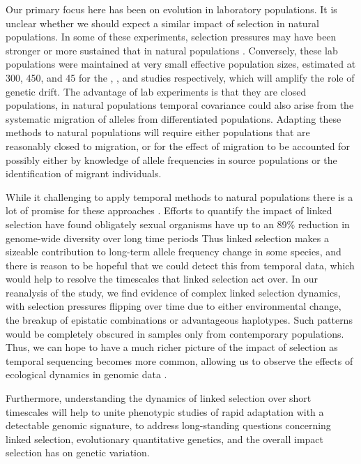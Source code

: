 \documentclass[11pt]{article}
\begin{document}
Our primary focus here has been on evolution in laboratory populations. It is
unclear whether we should expect a similar impact of selection in natural
populations. In some of these experiments, selection pressures may have been
stronger or more sustained that in natural populations
\parencite{Hendry1999-zu,Hairston2005-ga}. Conversely, these lab
populations were maintained at very small effective population sizes, estimated
at 300, 450, and 45 for the \textcite{Barghi2019-qy}, \textcite{Kelly2019-dc},
and \textcite{Castro2019-uk} studies respectively, which will amplify the role
of genetic drift. The advantage of lab experiments is that they are closed
populations, in natural populations temporal covariance could also arise from
the systematic migration of alleles from differentiated populations.
Adapting these methods to natural populations will require either
populations that are reasonably closed to migration, or for the effect of
migration to be accounted for possibly either by knowledge of allele
frequencies in source populations or the identification of migrant individuals. 

While it challenging to apply temporal methods to natural populations there is
a lot of promise for these approaches
\parencite{Bergland2014-ij,Machado2018-cs}. Efforts to quantify the impact of
linked selection have found obligately sexual organisms have up to an 89\%
reduction in genome-wide diversity over long time periods
\parencite{McVicker2009-ax,Elyashiv2016-vt,Corbett-Detig2015-gt,Coop2016-gx,Comeron2014-nh}
Thus linked selection makes a sizeable contribution to long-term allele
frequency change in some species, and there is reason to be hopeful that we
could detect this from temporal data, which would help to resolve the
timescales that linked selection act over. In our reanalysis of the
\textcite{Barghi2019-qy} study, we find evidence of complex linked selection
dynamics, with selection pressures flipping over time due to either
environmental change, the breakup of epistatic combinations or advantageous
haplotypes. Such patterns would be completely obscured in samples only from
contemporary populations. Thus, we can hope to have a much richer picture
of the impact of selection as temporal sequencing becomes more common,
allowing us to observe the effects of ecological dynamics in genomic data
\parencite{Hairston2005-ga}.

Furthermore, understanding the dynamics of linked selection over short
timescales will help to unite phenotypic studies of rapid adaptation with a
detectable genomic signature, to address long-standing questions concerning
linked selection, evolutionary quantitative genetics, and the overall impact
selection has on genetic variation. 
\end{document}
